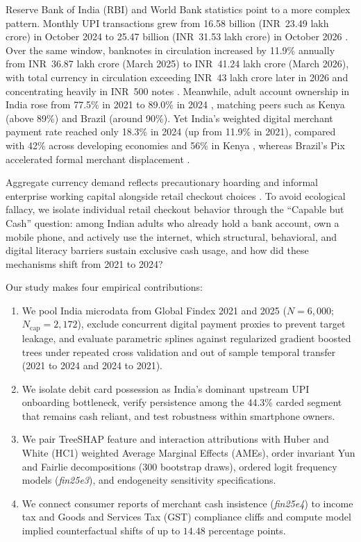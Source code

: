 \documentclass[conference]{IEEEtran}
\begin{document}
Reserve Bank of India (RBI) and World Bank statistics point to a more complex pattern. Monthly UPI transactions grew from 16.58 billion (INR~23.49 lakh crore) in October 2024 to 25.47 billion (INR~31.53 lakh crore) in October 2026 \cite{npci2026}. Over the same window, banknotes in circulation increased by 11.9\% annually from INR~36.87 lakh crore (March 2025) to INR~41.24 lakh crore (March 2026), with total currency in circulation exceeding INR~43 lakh crore later in 2026 and concentrating heavily in INR~500 notes \cite{rbi2026, awasthy2022}. Meanwhile, adult account ownership in India rose from 77.5\% in 2021 to 89.0\% in 2024 \cite{demirguc2022, worldbank2025}, matching peers such as Kenya (above 89\%) and Brazil (around 90\%). Yet India's weighted digital merchant payment rate reached only 18.3\% in 2024 (up from 11.9\% in 2021), compared with 42\% across developing economies and 56\% in Kenya \cite{worldbank2025}, whereas Brazil's Pix accelerated formal merchant displacement \cite{duarte2022}.

Aggregate currency demand reflects precautionary hoarding and informal enterprise working capital alongside retail checkout choices \cite{ashworth2020, awasthy2022, awasthy2025}. To avoid ecological fallacy, we isolate individual retail checkout behavior through the ``Capable but Cash'' question: among Indian adults who already hold a bank account, own a mobile phone, and actively use the internet, which structural, behavioral, and digital literacy barriers sustain exclusive cash usage, and how did these mechanisms shift from 2021 to 2024?

Our study makes four empirical contributions:
\begin{enumerate}
    \item We pool India microdata from Global Findex 2021 and 2025 ($N = 6,000$; $N_{\text{cap}} = 2,172$), exclude concurrent digital payment proxies to prevent target leakage, and evaluate parametric splines against regularized gradient boosted trees under repeated cross validation and out of sample temporal transfer (2021 to 2024 and 2024 to 2021).
    \item We isolate debit card possession as India's dominant upstream UPI onboarding bottleneck, verify persistence among the 44.3\% carded segment that remains cash reliant, and test robustness within smartphone owners.
    \item We pair TreeSHAP feature and interaction attributions with Huber and White (HC1) weighted Average Marginal Effects (AMEs), order invariant Yun and Fairlie decompositions (300 bootstrap draws), ordered logit frequency models (\textit{fin25e3}), and endogeneity sensitivity specifications.
    \item We connect consumer reports of merchant cash insistence (\textit{fin25e4}) to income tax and Goods and Services Tax (GST) compliance cliffs and compute model implied counterfactual shifts of up to $14.48$ percentage points.
\end{enumerate}
\end{document}
